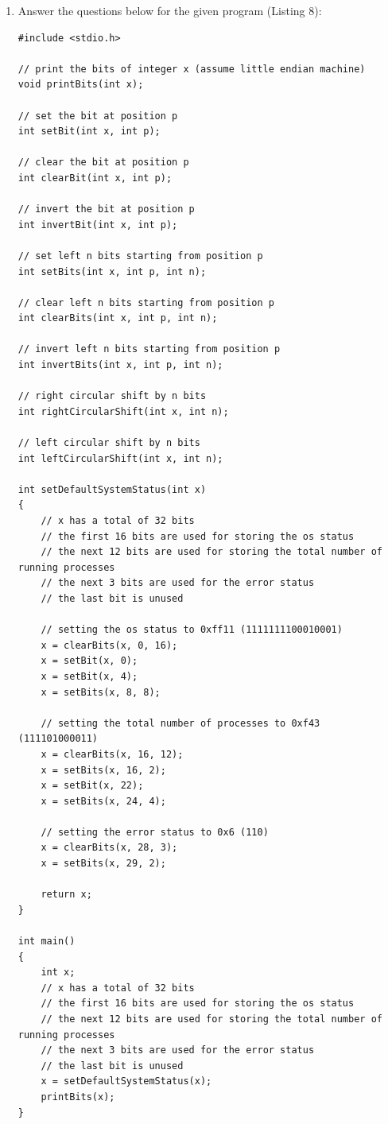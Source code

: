 \documentclass[12pt,a3paper]{article}
\begin{document}
\begin{enumerate}
\item Answer the questions below for the given program (Listing 8):

\begin{lstlisting}
#include <stdio.h>

// print the bits of integer x (assume little endian machine)
void printBits(int x);

// set the bit at position p
int setBit(int x, int p);

// clear the bit at position p
int clearBit(int x, int p);

// invert the bit at position p
int invertBit(int x, int p);

// set left n bits starting from position p
int setBits(int x, int p, int n);

// clear left n bits starting from position p
int clearBits(int x, int p, int n);

// invert left n bits starting from position p
int invertBits(int x, int p, int n);

// right circular shift by n bits
int rightCircularShift(int x, int n);

// left circular shift by n bits
int leftCircularShift(int x, int n);

int setDefaultSystemStatus(int x)
{
    // x has a total of 32 bits
    // the first 16 bits are used for storing the os status
    // the next 12 bits are used for storing the total number of running processes
    // the next 3 bits are used for the error status
    // the last bit is unused

    // setting the os status to 0xff11 (1111111100010001)
    x = clearBits(x, 0, 16);
    x = setBit(x, 0);
    x = setBit(x, 4);
    x = setBits(x, 8, 8);

    // setting the total number of processes to 0xf43 (111101000011)
    x = clearBits(x, 16, 12);
    x = setBits(x, 16, 2);
    x = setBit(x, 22);
    x = setBits(x, 24, 4);

    // setting the error status to 0x6 (110)
    x = clearBits(x, 28, 3);
    x = setBits(x, 29, 2);

    return x;
}

int main()
{
    int x;
    // x has a total of 32 bits
    // the first 16 bits are used for storing the os status
    // the next 12 bits are used for storing the total number of running processes
    // the next 3 bits are used for the error status
    // the last bit is unused
    x = setDefaultSystemStatus(x);
    printBits(x);
}
\end{lstlisting}


\end{enumerate}
\end{document}

